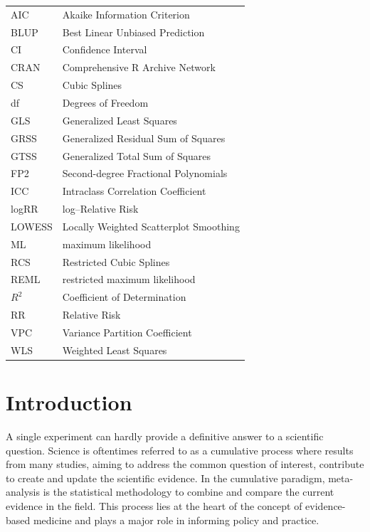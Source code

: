 \documentclass[11pt,a4paper,twoside,openany]{book}\usepackage{knitr}
\begin{document}
{\begin{tabular}{ll}
AIC & Akaike Information Criterion \\
BLUP & Best Linear Unbiased Prediction \\
CI & Confidence Interval \\
CRAN & Comprehensive R Archive Network \\
CS & Cubic Splines \\
df & Degrees of Freedom \\
GLS & Generalized Least Squares \\
GRSS & Generalized Residual Sum of Squares \\
GTSS & Generalized Total Sum of Squares \\
FP2 & Second-degree Fractional Polynomials \\
ICC & Intraclass Correlation Coefficient \\
logRR & log--Relative Risk \\
LOWESS & Locally Weighted Scatterplot Smoothing \\
ML & maximum likelihood \\
RCS & Restricted Cubic Splines \\
REML & restricted maximum likelihood \\
$R^2$ & Coefficient of Determination \\
RR & Relative Risk \\
VPC & Variance Partition Coefficient \\
WLS & Weighted Least Squares


\end{tabular}

\mainmatter
\pagestyle{mainmatter}



%

\chapter{Introduction}

A single experiment can hardly provide a definitive answer to a scientific question. Science is oftentimes referred to as a cumulative process where results from many studies, aiming to address the common question of interest, contribute to create and update the scientific evidence. In the cumulative paradigm, meta-analysis is the statistical methodology to combine and compare the current evidence in the field. This process lies at the heart of the concept of evidence-based medicine and plays a major role in informing policy and practice.

}
\end{document}
